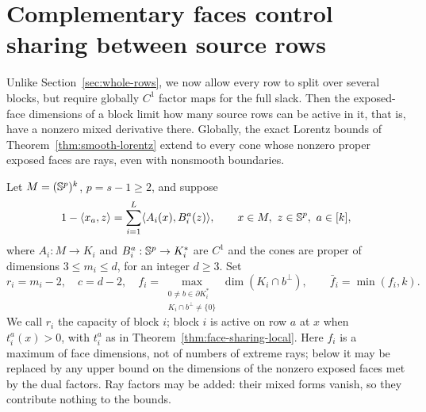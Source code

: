 \section{Complementary faces control sharing between source rows}
\label{sec:face-sharing}
Unlike Section~\ref{sec:whole-rows}, we now allow every row to split
over several blocks, but require globally $C^1$ factor maps for the full
slack. Then the exposed-face dimensions of a block limit how many source
rows can be active in it, that is, have a nonzero mixed derivative there.
Globally, the exact Lorentz bounds of Theorem~\ref{thm:smooth-lorentz}
extend to every cone whose nonzero proper exposed faces are rays, even
with nonsmooth boundaries.

Let $M=(\mathbb S^p)^k$, $p=s-1\geq2$, and suppose
\begin{equation}\label{eq:proper-full-rows}
 1-\langle x_a,z\rangle=\sum_{i=1}^L\langle A_i(x),B_i^a(z)\rangle,
 \qquad x\in M,\ z\in\mathbb S^p,\ a\in[k],
\end{equation}
where $A_i:M\to K_i$ and $B_i^a:\mathbb S^p\to K_i^*$ are $C^1$ and the
cones are proper of dimensions $3\leq m_i\leq d$, for an integer
$d\geq3$. Set
\[
 r_i=m_i-2,\quad c=d-2,\quad
 f_i=\max_{\substack{0\ne b\in\partial K_i^*\\K_i\cap b^\perp\ne\{0\}}}
       \dim(K_i\cap b^\perp),\qquad \bar f_i=\min(f_i,k).
\]
We call $r_i$ the capacity of block $i$; block $i$ is active on row $a$
at $x$ when $t_i^a(x)>0$, with $t_i^a$ as in
Theorem~\ref{thm:face-sharing-local}. Here $f_i$ is a maximum of face
dimensions, not of numbers of extreme rays; below it may be replaced by
any upper bound on the dimensions of the nonzero exposed faces met by
the dual factors. Ray factors may be added: their mixed forms
vanish, so they contribute nothing to the bounds.

